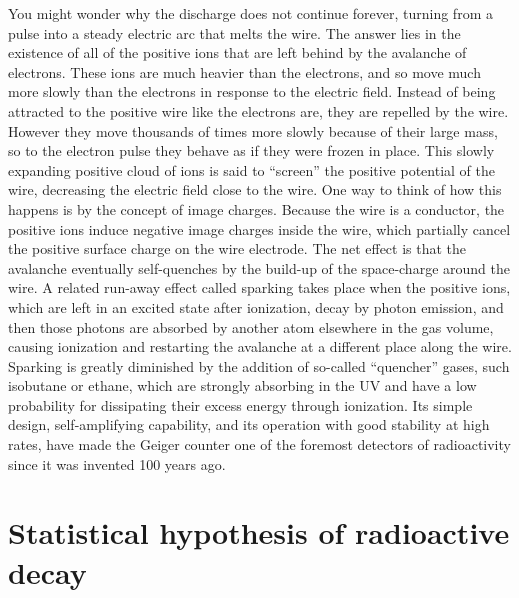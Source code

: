 \documentclass{revtex4}
\begin{document}
You might wonder why the discharge does not continue forever, turning from
a pulse into a steady electric arc that melts the wire.  The answer lies in
the existence of all of the positive ions that are left behind by the
avalanche of electrons.  These ions are much heavier than the electrons,
and so move much more slowly than the electrons in response to the electric
field.  Instead of being attracted to the positive wire like the electrons
are, they are repelled by the wire.  However they move thousands of times
more slowly because of their large mass, so to the electron pulse they behave
as if they were frozen in place.  This slowly expanding positive cloud of
ions is said to ``screen'' the positive potential of the wire, decreasing
the electric field close to the wire.  One way to think of how this happens
is by the concept of image charges.  Because the wire is a conductor, the
positive ions induce negative image charges inside the wire, which partially
cancel the positive surface charge on the wire electrode.  The net effect is
that the avalanche eventually self-quenches by the build-up of the 
space-charge around the wire.  A related run-away effect called sparking
takes place when the positive ions, which are left in an excited state after
ionization, decay by photon emission, and then those photons are absorbed by
another atom elsewhere in the gas volume, causing ionization and restarting
the avalanche at a different place along the wire.  Sparking is greatly
diminished by the addition of so-called ``quencher'' gases, such isobutane
or ethane, which are strongly absorbing in the UV and have a low probability
for dissipating their excess energy through ionization.  Its simple design,
self-amplifying capability, and its operation with good stability at high
rates, have made the Geiger counter one of the foremost detectors of
radioactivity since it was invented 100 years ago.

\section{Statistical hypothesis of radioactive decay}
\end{document}
